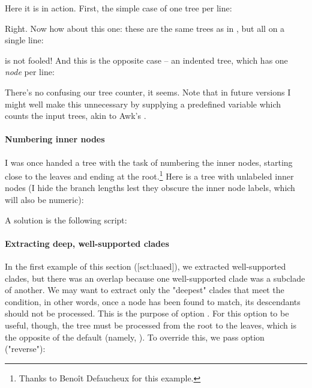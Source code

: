 Here it is in action. First, the simple case of one tree per line:



Right. Now how about this one: these are the same trees as in
, but all on a single line:



\luaed{} is not fooled! And this is the opposite case -- an indented tree, which has one {\em node} per line:



There's no confusing our tree counter, it seems. Note that in future versions I
might well make this unnecessary by supplying a predefined variable which counts
the input trees, akin to Awk's .

\paragraph{Numbering inner nodes}

I was once handed a tree with the task of numbering the inner nodes, starting
close to the leaves and ending at the root.\footnote{Thanks to Beno\^{i}t
Defaucheux for this example.} Here is a tree with unlabeled inner nodes (I hide
the branch lengths lest they obscure the inner node labels, which will also be
numeric):

\startalignment[center]
\externalfigure[ed_22_svg]
\stopalignment

A solution is the following \luaed{} script:


\startalignment[center]
\externalfigure[ed_21_svg]
\stopalignment 

\paragraph{Extracting deep, well-supported clades}

In the first example of this section (\in{}[sct:luaed]), we extracted
well-supported clades, but there was an overlap because one well-supported clade
was a subclade of another. We may want to extract only the "deepest" clades that
meet the condition, in other words, once a node has been found to match, its
descendants should not be processed. This is the purpose of option .
For this option to be useful, though, the tree must be processed from the root
to the leaves, which is the opposite of the default (namely, \no). To override
this, we pass option  ("reverse"):

